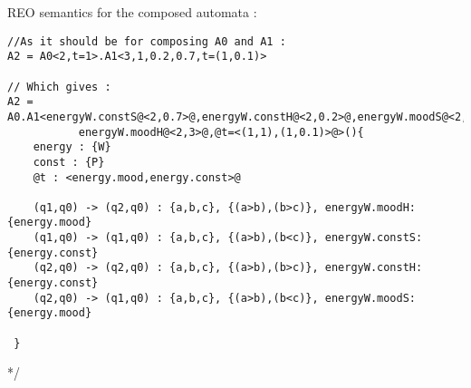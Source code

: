 \documentclass{article}
\theoremstyle{plain}
\theoremstyle{definition}
\begin{document}
\newpage
\noindent
REO semantics for the composed automata :
\begin{lstlisting}[frame=single,style=base] 
//As it should be for composing A0 and A1 :
A2 = A0<2,t=1>.A1<3,1,0.2,0.7,t=(1,0.1)>

// Which gives :
A2 = A0.A1<energyW.constS@<2,0.7>@,energyW.constH@<2,0.2>@,energyW.moodS@<2,2>@,
           energyW.moodH@<2,3>@,@t=<(1,1),(1,0.1)>@>(){
    energy : {W}
    const : {P}
    @t : <energy.mood,energy.const>@

    (q1,q0) -> (q2,q0) : {a,b,c}, {(a>b),(b>c)}, energyW.moodH:{energy.mood}
    (q1,q0) -> (q1,q0) : {a,b,c}, {(a>b),(b<c)}, energyW.constS:{energy.const}
    (q2,q0) -> (q2,q0) : {a,b,c}, {(a>b),(b>c)}, energyW.constH:{energy.const}
    (q2,q0) -> (q1,q0) : {a,b,c}, {(a>b),(b<c)}, energyW.moodS:{energy.mood}

 }
\end{lstlisting}
\iffalse
    (1) edge node [left] {0.6} (4)
        edge [bend right] node[left] {0.3} (2)
        edge [loop above] node {0.1} (1)

    (2) edge node [right] {0.4} (1)
        edge node {0.3} (4)
        edge [loop left] node {0.4} (2)
        edge [bend right] node[left] {0.1} (3)

    (3) edge node [right] {0.8} (2)
        edge [bend right] node[right] {0.2} (4)

    (4) edge node [left] {0.2} (3)
        edge [loop right] node {0.6} (4)
        edge [bend right] node[right] {0.2} (1);
    Define styles for edges, arrows, and nodes
        circle style for the main nodes, and font options so we don't need to adjust fonts within the nodes
        For arrows, we use stealth' which is the name for a kind of arrow tip and shorten to not touch the node
        The option auto is useful for automatic placement of nodes next to edges, instead of sitting directly on the edge. As we will mostly use left and right options, it will have effect just for one node. But good to have it as general option in the scope.
    Place the main nodes
    Draw edges with nodes for description
    Use options loop and bend for loops and bent edges
    Specify left and right for bend direction and node placement
\fi
*/
\end{document}
